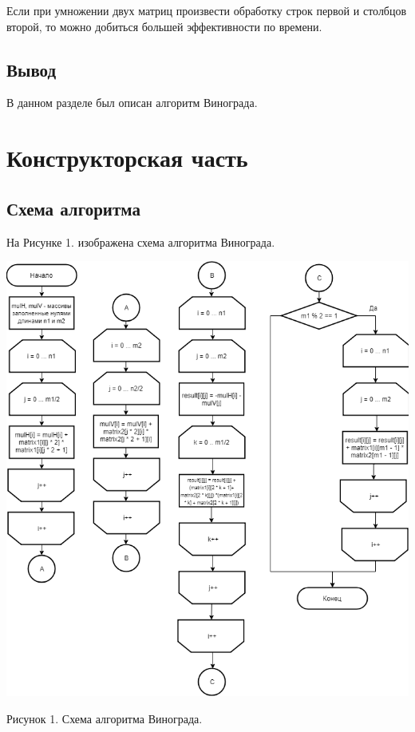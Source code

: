 \documentclass[12pt]{report}
\begin{document}
	Если при умножении двух матриц произвести обработку строк первой и столбцов второй, то можно добиться большей эффективности по времени.
	
	\section*{Вывод}
	
	В данном разделе был описан алгоритм Винограда.
	
	\chapter{Конструкторская часть}
	
	\section{Схема алгоритма}
	
	На Рисунке 1. изображена схема алгоритма Винограда.
	
	\begin{center}
		\includegraphics[scale=0.5]{BlockSchemeMult-Vin.png}
		
		Рисунок 1. Схема алгоритма Винограда.
	\end{center}
\end{document}
